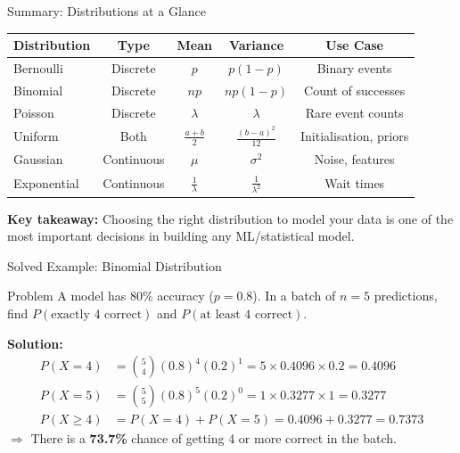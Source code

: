 \begin{frame}{Summary: Distributions at a Glance}
\begin{table}[h]
\centering
\footnotesize
\begin{tabular}{l c c c c}
\toprule
\textbf{Distribution} & \textbf{Type} & \textbf{Mean} & \textbf{Variance} & \textbf{Use Case}\\
\midrule
Bernoulli & Discrete & $p$ & $p(1-p)$ & Binary events\\
Binomial & Discrete & $np$ & $np(1-p)$ & Count of successes\\
Poisson & Discrete & $\lambda$ & $\lambda$ & Rare event counts\\
Uniform & Both & $\frac{a+b}{2}$ & $\frac{(b-a)^2}{12}$ & Initialisation, priors\\
Gaussian & Continuous & $\mu$ & $\sigma^2$ & Noise, features\\
Exponential & Continuous & $\frac{1}{\lambda}$ & $\frac{1}{\lambda^2}$ & Wait times\\
\bottomrule
\end{tabular}
\end{table}
\vspace{4pt}
\textbf{Key takeaway:} Choosing the right distribution to model your data is one of the most important decisions in building any ML/statistical model.
\end{frame}

\begin{frame}{Solved Example: Binomial Distribution}
\begin{exampleblock}{Problem}
A model has 80\% accuracy ($p=0.8$). In a batch of $n=5$ predictions,\\
find $P(\text{exactly 4 correct})$ and $P(\text{at least 4 correct})$.
\end{exampleblock}
\textbf{Solution:}
\begin{align*}
P(X=4) &= \binom{5}{4}(0.8)^4(0.2)^1 = 5 \times 0.4096 \times 0.2 = \mathbf{0.4096}\\[6pt]
P(X=5) &= \binom{5}{5}(0.8)^5(0.2)^0 = 1 \times 0.3277 \times 1 = \mathbf{0.3277}\\[6pt]
P(X \geq 4) &= P(X=4) + P(X=5) = 0.4096 + 0.3277 = \mathbf{0.7373}
\end{align*}
$\Rightarrow$ There is a \textbf{73.7\%} chance of getting 4 or more correct in the batch.
\end{frame}

